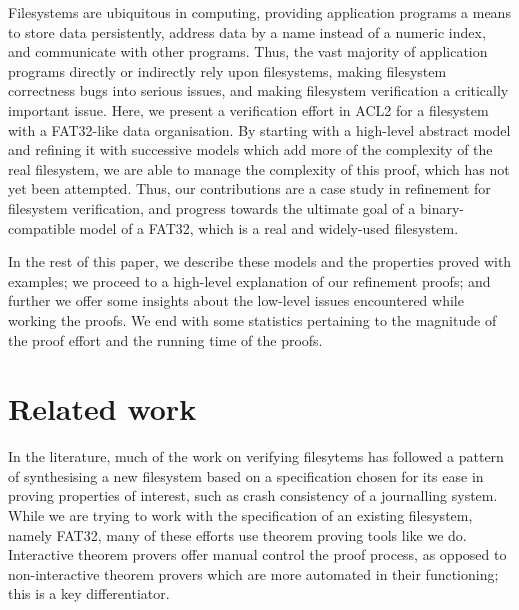 \documentclass[runningheads,a4paper]{llncs}
\begin{document}
Filesystems are ubiquitous in computing, providing application
programs a means to store data persistently, address data by a name
instead of a numeric index, and communicate with other programs.
Thus, the vast majority of application programs
directly or indirectly rely upon filesystems, making filesystem
correctness bugs into serious issues, and making filesystem
verification a critically important issue. Here, we present a
verification effort in ACL2 for a filesystem with a FAT32-like data
organisation. By starting with a high-level
abstract model and refining \cite{abadi1991existence} it with
successive models which add more of the complexity of the real
filesystem, we are able to manage the complexity of this proof, which
has not yet been attempted. Thus, our contributions are a case study
in refinement for filesystem verification, and progress towards the
ultimate goal of a binary-compatible model of a FAT32, which is a real
and widely-used filesystem.

In the rest of this paper, we describe these
models and the properties proved with examples; we proceed to a
high-level explanation of our refinement proofs; and further we offer
some insights about the low-level issues encountered while working the
proofs. We end with some statistics pertaining to the magnitude of the
proof effort and the running time of the proofs.

\section{Related work}

In the literature, much of the work on verifying filesytems has
followed a pattern of synthesising a new filesystem based on a
specification chosen for its ease in proving properties of interest,
such as crash consistency of a journalling system. While we are trying
to work with the specification of an existing filesystem, namely
FAT32, many of these efforts use theorem proving tools like we
do. Interactive theorem provers offer manual control the proof
process, as opposed to non-interactive theorem provers which are more
automated in their functioning; this is a key differentiator.
\end{document}
